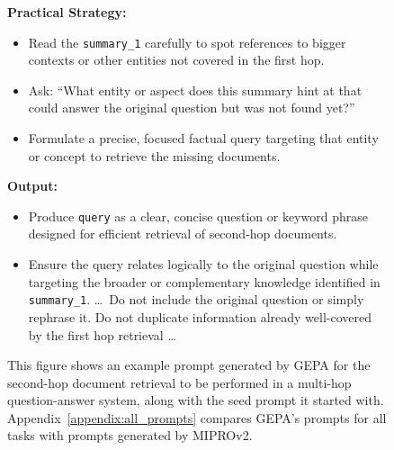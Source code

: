 \begin{figure}[!ht]
\begin{tcolorbox}
\vspace{1mm}
\textbf{Practical Strategy:}
\begin{itemize}[left=0em]
    \item Read the \texttt{summary\_1} carefully to spot references to bigger contexts or other entities not covered in the first hop.
    \item Ask: ``What entity or aspect does this summary hint at that could answer the original question but was not found yet?''
    \item Formulate a precise, focused factual query targeting that entity or concept to retrieve the missing documents.
\end{itemize}

\vspace{1mm}
\textbf{Output:}
\begin{itemize}[left=0em]
    \item Produce \texttt{query} as a clear, concise question or keyword phrase designed for efficient retrieval of second-hop documents.
    \item Ensure the query relates logically to the original question while targeting the broader or complementary knowledge identified in \texttt{summary\_1}. \ldots~Do not include the original question or simply rephrase it. Do not duplicate information already well-covered by the first hop
retrieval \ldots
\end{itemize}
\end{tcolorbox}

\caption{This figure shows an example prompt generated by GEPA for the second-hop document retrieval to be performed in a multi-hop question-answer system, along with the seed prompt it started with. Appendix~\ref{appendix:all_prompts} compares GEPA's prompts for all tasks with prompts generated by MIPROv2.}\label{fig:main_fig_prompt_example}
\end{figure}


